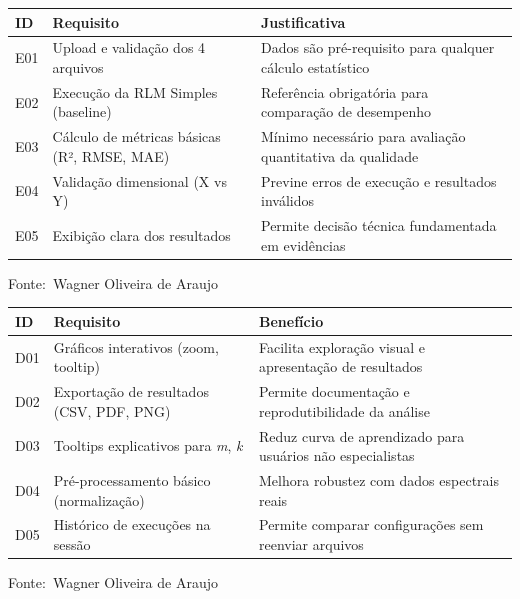 \documentclass[12pt,a4paper]{article}
\newcommand{\oautor}{Wagner Oliveira de Araujo}
\begin{document}
\begin{quadro}[ht]
\centering
\small
\caption{Requisitos essenciais do sistema (Must Have)}
\label{quadro:essenciais}
\begin{threeparttable}
\begin{tabularx}{\textwidth}{|l|X|X|} \hline
\textbf{ID} & \textbf{Requisito} & \textbf{Justificativa} \\ \hline
E01 & Upload e validação dos 4 arquivos & Dados são pré-requisito para qualquer cálculo estatístico \\ \hline
E02 & Execução da RLM Simples (baseline) & Referência obrigatória para comparação de desempenho \\ \hline
E03 & Cálculo de métricas básicas (R², RMSE, MAE) & Mínimo necessário para avaliação quantitativa da qualidade \\ \hline
E04 & Validação dimensional (X vs Y) & Previne erros de execução e resultados inválidos \\ \hline
E05 & Exibição clara dos resultados & Permite decisão técnica fundamentada em evidências \\ \hline
\end{tabularx}
\begin{tablenotes}[flushleft]
\footnotesize
\item Fonte:~\oautor
\end{tablenotes}
\end{threeparttable}
\end{quadro}

\begin{quadro}[ht]
\centering
\small
\caption{Requisitos desejáveis do sistema (Should Have)}
\label{quadro:desejaveis}
\begin{threeparttable}
\begin{tabularx}{\textwidth}{|l|X|X|} \hline
\textbf{ID} & \textbf{Requisito} & \textbf{Benefício} \\ \hline
D01 & Gráficos interativos (zoom, tooltip) & Facilita exploração visual e apresentação de resultados \\ \hline
D02 & Exportação de resultados (CSV, PDF, PNG) & Permite documentação e reprodutibilidade da análise \\ \hline
D03 & Tooltips explicativos para \textit{m}, \textit{k} & Reduz curva de aprendizado para usuários não especialistas \\ \hline
D04 & Pré-processamento básico (normalização) & Melhora robustez com dados espectrais reais \\ \hline
D05 & Histórico de execuções na sessão & Permite comparar configurações sem reenviar arquivos \\ \hline
\end{tabularx}
\begin{tablenotes}[flushleft]
\footnotesize
\item Fonte:~\oautor
\end{tablenotes}
\end{threeparttable}
\end{quadro}
\end{document}
